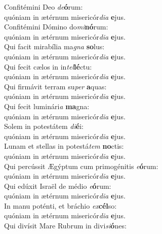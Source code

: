\evenverse Confitémini Deo \textit{de}\textbf{ó}rum:~\*\\
\evenverse quóniam in ætérnum misericór\textit{di}\textit{a} \textbf{e}jus.\\
\oddverse Confitémini Dómino do\textit{mi}\textbf{nó}rum:~\*\\
\oddverse quóniam in ætérnum misericór\textit{di}\textit{a} \textbf{e}jus.\\
\evenverse Qui facit mirabília ma\textit{gna} \textbf{so}lus:~\*\\
\evenverse quóniam in ætérnum misericór\textit{di}\textit{a} \textbf{e}jus.\\
\oddverse Qui fecit cælos in in\textit{tel}\textbf{lé}ctu:~\*\\
\oddverse quóniam in ætérnum misericór\textit{di}\textit{a} \textbf{e}jus.\\
\evenverse Qui firmávit terram su\textit{per} \textbf{a}quas:~\*\\
\evenverse quóniam in ætérnum misericór\textit{di}\textit{a} \textbf{e}jus.\\
\oddverse Qui fecit luminári\textit{a} \textbf{ma}gna:~\*\\
\oddverse quóniam in ætérnum misericór\textit{di}\textit{a} \textbf{e}jus.\\
\evenverse Solem in potestátem \textit{di}\textbf{é}i:~\*\\
\evenverse quóniam in ætérnum misericór\textit{di}\textit{a} \textbf{e}jus.\\
\oddverse Lunam et stellas in potestá\textit{tem} \textbf{no}ctis:~\*\\
\oddverse quóniam in ætérnum misericór\textit{di}\textit{a} \textbf{e}jus.\\
\evenverse Qui percússit Ægýptum cum primogénitis \textit{e}\textbf{ó}rum:~\*\\
\evenverse quóniam in ætérnum misericór\textit{di}\textit{a} \textbf{e}jus.\\
\oddverse Qui edúxit Israël de médio \textit{e}\textbf{ó}rum:~\*\\
\oddverse quóniam in ætérnum misericór\textit{di}\textit{a} \textbf{e}jus.\\
\evenverse In manu poténti, et bráchio \textit{ex}\textbf{cél}so:~\*\\
\evenverse quóniam in ætérnum misericór\textit{di}\textit{a} \textbf{e}jus.\\
\oddverse Qui divísit Mare Rubrum in divi\textit{si}\textbf{ó}nes:~\*\\
